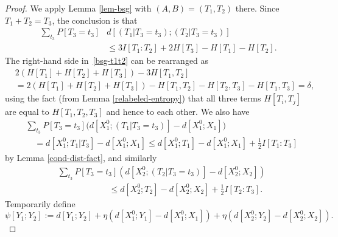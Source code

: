 \begin{proof}
  We apply Lemma \ref{lem-bsg} with $(A,B) = (T_1, T_2)$ there.
  Since $T_1 + T_2 = T_3$, the conclusion is that
  \begin{align} \nonumber \sum_{t_3} P[T_3 = t_3] & d[(T_1 | T_3 = t_3); (T_2 | T_3 = t_3)] \\ & \leq 3 I[T_1 : T_2] + 2 H[T_3] - H[T_1] - H[T_2].\label{bsg-t1t2}
  \end{align}
  The right-hand side in~\eqref{bsg-t1t2} can be rearranged as
  \begin{align*} & 2( H[T_1] + H[T_2] + H[T_3]) - 3 H[T_1,T_2] \\ & = 2(H[T_1] + H[T_2] + H[T_3]) - H[T_1,T_2] - H[T_2,T_3] - H[T_1, T_3] = \delta,\end{align*}
  using the fact (from Lemma \ref{relabeled-entropy}) that all three terms $H[T_i,T_j]$ are equal to $H[T_1,T_2,T_3]$ and hence to each other.
  We also have
  \begin{align*}
  &  \sum_{t_3} P[T_3 = t_3] \bigl(d[X^0_1; (T_1 | T_3=t_3)] - d[X^0_1;X_1]\bigr) \\
  &\quad = d[X^0_1; T_1 | T_3] - d[X^0_1;X_1] \leq d[X^0_1;T_1] - d[X^0_1;X_1] + \tfrac{1}{2} I[T_1 : T_3]
  \end{align*}
  by Lemma \ref{cond-dist-fact}, and similarly
  \begin{align*}
  &  \sum_{t_3} P[T_3 = t_3] (d[X^0_2;(T_2 | T_3=t_3)] - d[X^0_2; X_2]) \\
  &\quad\quad\quad\quad\quad\quad \leq d[X^0_2;T_2] - d[X^0_2;X_2] + \tfrac{1}{2} I[T_2 : T_3].
  \end{align*}
  Temporarily define
  \[ \psi[Y_1; Y_2] := d[Y_1;Y_2] +  \eta (d[X_1^0;Y_1] - d[X_1^0;X_1]) + \eta(d[X_2^0;Y_2] - d[X_2^0;X_2]).\]


\end{proof}
